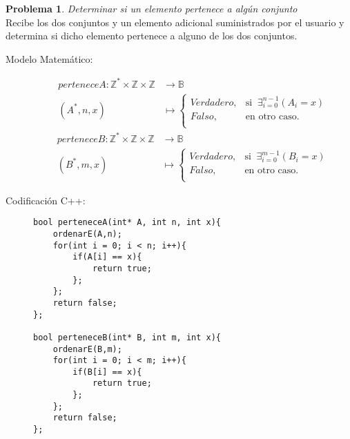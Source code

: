 \documentclass{article}
\theoremstyle{plain}
\theoremstyle{definition}
\newtheorem{problem}{Problema}
\begin{document}
\begin{problem}\emph{Determinar si un elemento pertenece a algún conjunto}\\
Recibe los dos conjuntos y un elemento adicional suministrados por el usuario y determina si dicho elemento pertenece a alguno de los dos conjuntos.
%
\begin{description}
\item[Modelo Matemático:]
%
\begin{align*}
perteneceA: \mathbb{Z}^*\times\mathbb{Z}\times\mathbb{Z}&\to \mathbb{B}\\
(A^*,n,x) &\mapsto
\begin{cases}
Verdadero, &\text{si }\ \exists_{i=0}^{n-1}(A_i=x)\\
Falso, &\text{en otro caso}.\\
\end{cases}
\end{align*}
%
\begin{align*}
perteneceB: \mathbb{Z}^*\times\mathbb{Z}\times\mathbb{Z}&\to \mathbb{B}\\
(B^*,m,x) &\mapsto
\begin{cases}
Verdadero, &\text{si }\ \exists_{i=0}^{m-1}(B_i=x)\\
Falso, &\text{en otro caso}.\\
\end{cases}
\end{align*}
%
\item[Codificación \textsf{C++}:]\hfill
%
\begin{verbatim}
bool perteneceA(int* A, int n, int x){
    ordenarE(A,n);
    for(int i = 0; i < n; i++){
        if(A[i] == x){
            return true;
        };
    };
    return false;
};

bool perteneceB(int* B, int m, int x){
    ordenarE(B,m);
    for(int i = 0; i < m; i++){
        if(B[i] == x){
            return true;
        };
    };
    return false;
};
\end{verbatim}
\end{description}
\end{problem}
\end{document}
